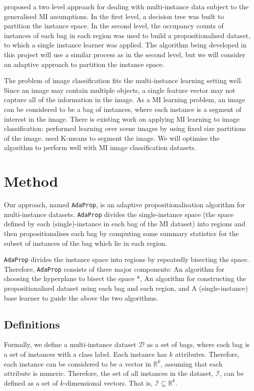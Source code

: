 \documentclass[a4paper,12pt]{article} %
\newcommand{\AdaProp}{\texttt{AdaProp}\xspace}
\newcommand{\real}{\mathbb{R}}
\newcommand{\mcl}[1]{\mathcal{#1}}
\begin{document}
 proposed a two level approach for dealing with multi-instance data subject to the generalised MI assumptions. In the first level, a decision tree was built to partition the instance space. In the second level, the occupancy counts of instances of each bag in each region was used to build a propositionalised dataset, to which a single instance learner was applied.
The algorithm being developed in this project will use a similar process as  in the second level, but we will consider an adaptive approach to partition the instance space.

The problem of image classification fits the multi-instance learning setting well. Since an image may contain multiple objects, a single feature vector may not capture all of the information in the image. As a MI learning problem, an image can be considered to be a bag of instances, where each instance is a segment of interest in the image. There is existing work on applying MI learning to image classification:  performed learning over scene images by using fixed size partitions of the image.  used K-means to segment the image. We will optimise the algorithm to perform well with MI image classification datasets.


\section{Method}

Our approach, named \AdaProp, is an adaptive propositionalisation algorithm 
    for multi-instance datasets.
\AdaProp divides the single-instance space
    (the space defined by each (single)-instance in each bag of the MI dataset)
    into regions and then
    propositionalises each bag by computing some summary statistics for the 
    subset of instances of the bag which lie in each region.

\AdaProp divides the instance space into regions
    by repeatedly bisecting the space.
Therefore, \AdaProp consists of three major components: 
    An algorithm for choosing the hyperplane to bisect the space *,
    An algorithm for constructing the propositionalised dataset 
        using each bag and each region, and
    A (single-instance) base learner to guide the above the two algorithms.

\subsection{Definitions}
Formally, we define a multi-instance dataset $\mcl{D}$ as a set of bags, 
    where each bag is a set of instances with a class label.
Each instance has $k$ attributes.
Therefore, each instance can be considered to be a vector in $\real^k$,
    assuming that each attribute is numeric.
Therefore, the set of all instances in the dataset, $\mcl{I}$,
    can be defined as a set of $k$-dimensional vectors.
That is, $ \mcl{I} \subseteq \real^k $.
\end{document}
